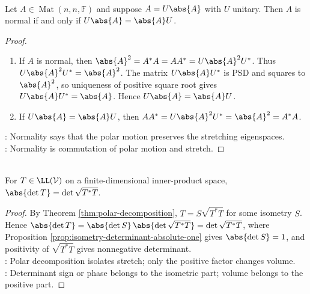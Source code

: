 \begin{theorem} \label{thm:normal-iff-polar-factors-commute} \\
Let $A\in\operatorname{Mat}(n,n,\mathbb{F})$ and suppose $A=U\abs{A}$ with $U$ unitary. Then $A$ is normal if and only if $U\abs{A}=\abs{A}U$.
\begin{proof}
\begin{enumerate}[label=\roman*.]
\setlength{\itemsep}{0pt}
\item[$(\Rightarrow)$] If $A$ is normal, then $\abs{A}^2=A^*A=AA^*=U\abs{A}^2U^*$. Thus $U\abs{A}^2U^*=\abs{A}^2$. The matrix $U\abs{A}U^*$ is PSD and squares to $\abs{A}^2$, so uniqueness of positive square root gives $U\abs{A}U^*=\abs{A}$. Hence $U\abs{A}=\abs{A}U$.
\item[$(\Leftarrow)$] If $U\abs{A}=\abs{A}U$, then $AA^*=U\abs{A}^2U^*=\abs{A}^2=A^*A$.
\end{enumerate}
: Normality says that the polar motion preserves the stretching eigenspaces.\\
: Normality is commutation of polar motion and stretch.
\end{proof}
\end{theorem}

\begin{proposition} \label{prop:absolute-determinant-positive-polar-factor} \\
For $T\in\LL(\mathcal{V})$ on a finite-dimensional inner-product space, $\abs{\det T}=\det\sqrt{T^*T}$.
\begin{proof}
By Theorem \ref{thm:polar-decomposition}, $T=S\sqrt{T^*T}$ for some isometry $S$. Hence $\abs{\det T} =\abs{\det S}\,\abs{\det\sqrt{T^*T}} =\det\sqrt{T^*T}$, where Proposition \ref{prop:isometry-determinant-absolute-one} gives $\abs{\det S}=1$, and positivity of $\sqrt{T^*T}$ gives nonnegative determinant.\\
: Polar decomposition isolates stretch; only the positive factor changes volume.\\
: Determinant sign or phase belongs to the isometric part; volume belongs to the positive part.
\end{proof}
\end{proposition}
